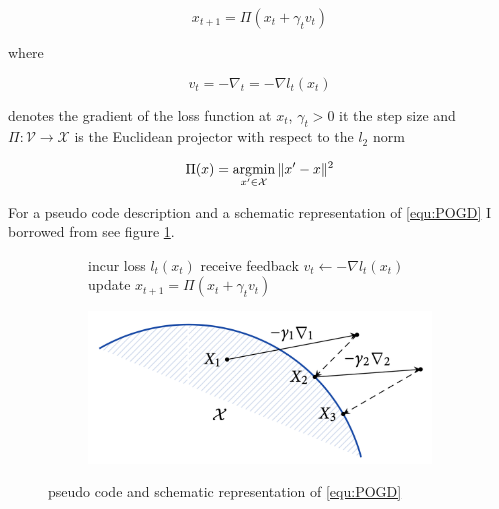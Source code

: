 \begin{equation}
   \tag{POGD}
        x_{t+1} = \Pi(x_t + \gamma_t v_t)
   \label{equ:POGD}
\end{equation}

where

\begin{equation*}
    v_t = -\nabla_t = -\nabla l_t(x_t)
\end{equation*}

denotes the gradient of the loss function at $x_t$, $\gamma_t > 0 $ it the step size and $\Pi: \mathcal{V} \to \mathcal{X}$ is the Euclidean projector with respect to the $l_2$ norm

\begin{equation}
    \Pi(x) = \operatorname*{\arg\!\min}_{x'\in \mathcal{X}}\|x'-x\|^{2}
    \label{equ:gradient}
\end{equation}

For a pseudo code description and a schematic representation of \ref{equ:POGD} I borrowed from \cite{HDRmertikopoulos} see figure \ref{fig:POGDpseudoCodeAndScheme}.

\begin{figure}[H]
\centering
\begin{subfigure}{.5\textwidth}
    \begin{algorithm}[H]
    \DontPrintSemicolon
     {
    incur loss $l_t(x_t)$ \;
    receive feedback $v_t \gets -\nabla l_t(x_t)$ \;
    update $x_{t+1} = \Pi(x_t + \gamma_t v_t)$ \;
    }
    \end{algorithm}
\end{subfigure}%
\begin{subfigure}{.5\textwidth}
  \centering
  \includegraphics[width=.9\linewidth]{logos/POGDscheme.png}
\end{subfigure}
\caption{pseudo code and schematic representation of \ref{equ:POGD}}
\label{fig:POGDpseudoCodeAndScheme}
\end{figure}

